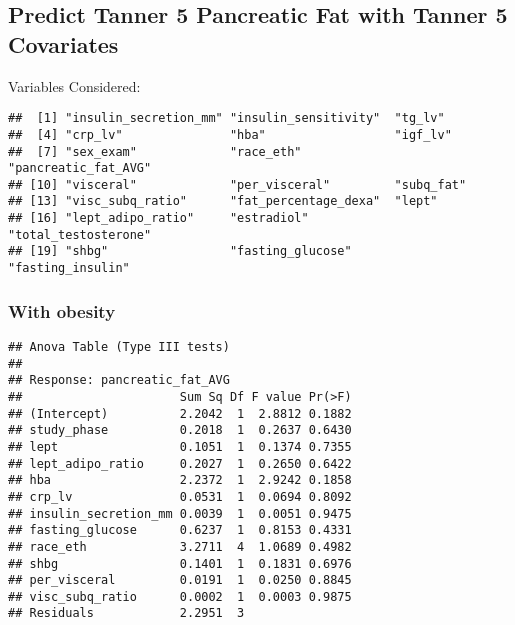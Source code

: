 \documentclass[
]{article}
\begin{document}
\hypertarget{predict-tanner-5-pancreatic-fat-with-tanner-5-covariates}{%
\subsection{Predict Tanner 5 Pancreatic Fat with Tanner 5
Covariates}\label{predict-tanner-5-pancreatic-fat-with-tanner-5-covariates}}

Variables Considered:

\begin{verbatim}
##  [1] "insulin_secretion_mm" "insulin_sensitivity"  "tg_lv"               
##  [4] "crp_lv"               "hba"                  "igf_lv"              
##  [7] "sex_exam"             "race_eth"             "pancreatic_fat_AVG"  
## [10] "visceral"             "per_visceral"         "subq_fat"            
## [13] "visc_subq_ratio"      "fat_percentage_dexa"  "lept"                
## [16] "lept_adipo_ratio"     "estradiol"            "total_testosterone"  
## [19] "shbg"                 "fasting_glucose"      "fasting_insulin"
\end{verbatim}

\hypertarget{with-obesity}{%
\subsubsection{With obesity}\label{with-obesity}}

\begin{verbatim}
## Anova Table (Type III tests)
## 
## Response: pancreatic_fat_AVG
##                      Sum Sq Df F value Pr(>F)
## (Intercept)          2.2042  1  2.8812 0.1882
## study_phase          0.2018  1  0.2637 0.6430
## lept                 0.1051  1  0.1374 0.7355
## lept_adipo_ratio     0.2027  1  0.2650 0.6422
## hba                  2.2372  1  2.9242 0.1858
## crp_lv               0.0531  1  0.0694 0.8092
## insulin_secretion_mm 0.0039  1  0.0051 0.9475
## fasting_glucose      0.6237  1  0.8153 0.4331
## race_eth             3.2711  4  1.0689 0.4982
## shbg                 0.1401  1  0.1831 0.6976
## per_visceral         0.0191  1  0.0250 0.8845
## visc_subq_ratio      0.0002  1  0.0003 0.9875
## Residuals            2.2951  3
\end{verbatim}
\end{document}
